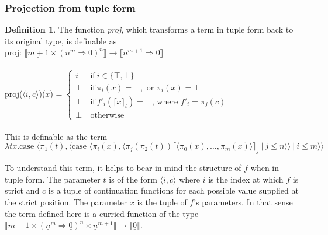 \documentclass[12pt,a4paper]{report}
\theoremstyle{definition}
\newtheorem{definition}{Definition}[chapter]%
\theoremstyle{remark}
\begin{document}
\subsubsection{Projection from tuple form}
\begin{definition}
    The function \emph{proj}, which transforms a term in tuple form back to its original type, is definable as \\
    proj: $\llbracket \underline{m + 1} \times (\underline{n}^{m} \Rightarrow \underline{0})^n \rrbracket \rightarrow \llbracket \underline{n}^{m+1} \Rightarrow \underline{0} \rrbracket$\\\\
    proj($\langle i, c\rangle$)($x$) =
    $\begin{cases}
        i\ &\text{if}\ i \in \{\top, \bot\}\\
        \top\ &\text{if}\ \pi_i(x) = \top, \text{ or } \pi_i(x) = \top\\
        \top\ &\text{if}\ f'_i(\lceil x \rceil_i) = \top \text{, where } f'_i = \pi_j(c)\\
        \bot\ &\text{otherwise}
    \end{cases}$\\\\
    This is definable as the term
    \[
    \lambda tx. \text{case } \langle \pi_1(t), \langle \text{case } \langle \pi_i(x), \langle \pi_j(\pi_2(t)) \lceil \langle \pi_0(x), \dots, \pi_m(x)\rangle\rceil_j\ | \ j \le n \rangle \rangle\ |\ i \leq m \rangle \rangle
    \]
\end{definition}

To understand this term, it helps to bear in mind the structure of $f$ when in tuple form. The parameter $t$ is of the form $\langle i, c\rangle$ where $i$ is the index at which $f$ is strict and $c$ is a tuple of continuation functions for each possible value supplied at the strict position. The parameter $x$ is the tuple of $f$'s parameters. In that sense the term defined here is a curried function of the type $\llbracket \underline{m + 1} \times (\underline{n}^{m} \Rightarrow \underline{0})^n \times \underline{n}^{m+1} \rrbracket \rightarrow \llbracket \underline{0} \rrbracket$.
\end{document}
